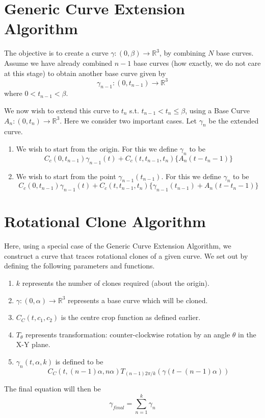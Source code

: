 \section{Generic Curve Extension Algorithm}
	The objective is to create a curve $\gamma : (0,\beta) \rightarrow \mathbb R^3$, by combining $N$ base curves. Assume we have already combined $n-1$ base curves (how exactly, we do not care at this stage) to obtain another base curve given by
	\begin{equation}
		\gamma_{n-1}:(0,t_{n-1}) \rightarrow \mathbb R^3
	\end{equation}
	where $0<t_{n-1}<\beta$.
	\par
	We now wish to extend this curve to $t_n$ s.t. $t_{n-1}<t_n \le \beta$, using a Base Curve $A_n:(0,t_n) \rightarrow \mathbb R^3$. Here we consider two important cases. Let $\gamma_n$ be the extended curve.
	\begin{enumerate}
		\item We wish to start from the origin. For this we define $\gamma_n$ to be
			\begin{equation}
				C_c(0,t_{n-1})\gamma_{n-1}(t) + C_c(t,t_{n-1},t_n)\{A_n(t-t_n-1)\}
			\end{equation}
		\item We wish to start from the point $\gamma_{n-1}(t_{n-1})$. For this we define $\gamma_n$ to be
			\begin{equation}
				C_c(0,t_{n-1})\gamma_{n-1}(t) + C_c(t,t_{n-1},t_n)\{\gamma_{n-1}(t_{n-1}) + A_n(t-t_n-1)\}
			\end{equation}
	\end{enumerate}

\section{Rotational Clone Algorithm}
	Here, using a special case of the Generic Curve Extension Algorithm, we construct a curve that traces rotational clones of a given curve. We set out by defining the following parameters and functions.
	\begin{enumerate}
		\item $k$ represents the number of clones required (about the origin).
		\item $\gamma:(0,\alpha) \rightarrow \mathbb R^3$ represents a base curve which will be cloned.
		\item $C_C(t,c_1,c_2)$ is the centre crop function as defined earlier.
		\item $T_{\theta}$ represents transformation: counter-clockwise rotation by an angle $\theta$ in the X-Y plane.
		\item $\gamma_n (t,\alpha,k)$ is defined to be
		\begin{equation}
			C_C(t,(n-1)\alpha,n\alpha)T_{(n-1)2\pi/k}(\gamma(t - (n-1)\alpha))
		\end{equation}		
	\end{enumerate}
	The final equation will then be
	\begin{equation}
		\gamma_{final} = \sum_{n=1}^k \gamma_n
	\end{equation}

